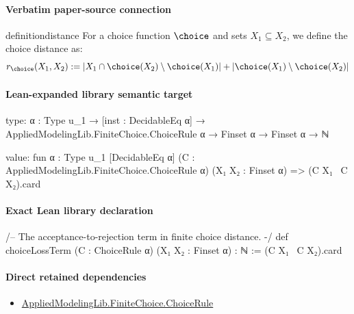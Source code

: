 \documentclass[10pt]{article}
\begin{document}
\paragraph{Verbatim paper-source connection}
\begin{ReviewVerbatim}
\begin{restatable}{definition}{distance} \label{def:distance}
For a choice function $\choice$ and sets $X_1 \subseteq X_2$, we define the choice distance as:
\begin{equation}
r_\choice(X_1, X_2) := |X_1 \cap \choice(X_2) \setminus \choice(X_1)| + |\choice(X_1) \setminus \choice(X_2)|
\end{equation}
\end{restatable}
\end{ReviewVerbatim}



\paragraph{Lean-expanded library semantic target}
\begin{ReviewVerbatim}
type:
{α : Type u_1} → [inst : DecidableEq α] → AppliedModelingLib.FiniteChoice.ChoiceRule α → Finset α → Finset α → ℕ

value:
fun {α : Type u_1} [DecidableEq α] (C : AppliedModelingLib.FiniteChoice.ChoiceRule α) (X₁ X₂ : Finset α) =>
  (C X₁ \ C X₂).card
\end{ReviewVerbatim}

\paragraph{Exact Lean library declaration}
\begin{ReviewVerbatim}
/-- The acceptance-to-rejection term in finite choice distance. -/
def choiceLossTerm (C : ChoiceRule α) (X₁ X₂ : Finset α) : ℕ :=
  (C X₁ \ C X₂).card
\end{ReviewVerbatim}

\paragraph{Direct retained dependencies}
\begin{itemize}\raggedright
\item \hyperlink{library-prerequisite-5dea5c3766008208}{Applied\allowbreak{}Modeling\allowbreak{}Lib.\allowbreak{}Finite\allowbreak{}Choice.\allowbreak{}Choice\allowbreak{}Rule}
\end{itemize}
\end{document}
